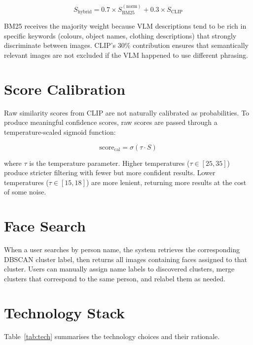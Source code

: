 \documentclass[12pt,a4paper,oneside]{report}
\begin{document}
\begin{equation}
  S_{\text{hybrid}} = 0.7 \times S_{\text{BM25}}^{(\text{norm})} + 0.3 \times S_{\text{CLIP}}
  \label{eq:hybrid}
\end{equation}

BM25 receives the majority weight because VLM descriptions tend to be rich in specific keywords (colours, object names, clothing descriptions) that strongly discriminate between images. CLIP's 30\% contribution ensures that semantically relevant images are not excluded if the VLM happened to use different phrasing.

\section{Score Calibration}

Raw similarity scores from CLIP are not naturally calibrated as probabilities. To produce meaningful confidence scores, raw scores are passed through a temperature-scaled sigmoid function:

\begin{equation}
  \text{score}_{\text{cal}} = \sigma(\tau \cdot S)
  \label{eq:calibration}
\end{equation}

where $\tau$ is the temperature parameter. Higher temperatures ($\tau \in [25, 35]$) produce stricter filtering with fewer but more confident results. Lower temperatures ($\tau \in [15, 18]$) are more lenient, returning more results at the cost of some noise.

\section{Face Search}

When a user searches by person name, the system retrieves the corresponding DBSCAN cluster label, then returns all images containing faces assigned to that cluster. Users can manually assign name labels to discovered clusters, merge clusters that correspond to the same person, and relabel them as needed.

\section{Technology Stack}

Table~\ref{tab:tech} summarises the technology choices and their rationale.
\end{document}

